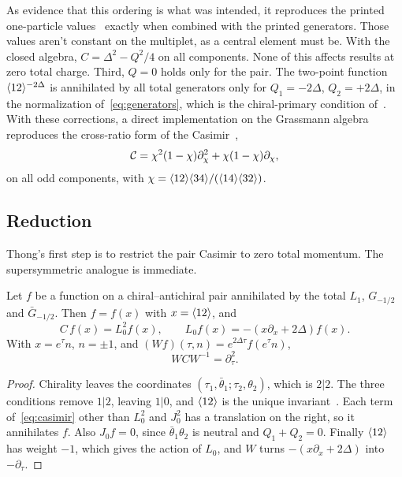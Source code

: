 As evidence that this ordering is what was intended, it reproduces the printed one-particle values~\cite[(A.10)--(A.12)]{Bulycheva:2018qcp} exactly when combined with the printed generators. Those values aren't constant on the multiplet, as a central element must be. With the closed algebra, $C=\Delta^2-Q^2/4$ on all components. None of this affects results at zero total charge. Third, $Q=0$ holds only for the pair. The two-point function $\langle 12\rangle^{-2\Delta}$ is annihilated by all total generators only for $Q_1=-2\Delta$, $Q_2=+2\Delta$, in the normalization of~\eqref{eq:generators}, which is the chiral-primary condition of~\cite{Fu:2016vas}. With these corrections, a direct implementation on the Grassmann algebra reproduces the cross-ratio form of the Casimir~\cite[(4.9), (A.16)]{Bulycheva:2018qcp},
\begin{equation}\label{eq:casimir-chi}
\mathcal{C}=\chi^2(1-\chi)\partial_\chi^2+\chi(1-\chi)\partial_\chi,
\end{equation}
on all odd components, with $\chi=\langle 12\rangle\langle 34\rangle/(\langle 14\rangle\langle 32\rangle)$.

\subsection{Reduction}

Thong's first step is to restrict the pair Casimir to zero total momentum. The supersymmetric analogue is immediate.

\begin{proposition}\label{prop:cylinder}
Let $f$ be a function on a chiral--antichiral pair annihilated by the total $L_1$, $G_{-1/2}$ and $\bar G_{-1/2}$. Then $f=f(x)$ with $x=\langle 12\rangle$, and
\begin{equation}\label{eq:reduced-casimir}
C\,f(x)=L_0^2f(x),\qquad L_0f(x)=-(x\partial_x+2\Delta)f(x).
\end{equation}
With $x=e^\tau n$, $n=\pm1$, and $(Wf)(\tau,n)=e^{2\Delta\tau}f(e^\tau n)$,
\begin{equation}\label{eq:WCW}
WCW^{-1}=\partial_\tau^2.
\end{equation}
\end{proposition}

\begin{proof}
Chirality leaves the coordinates $(\tau_1,\bar\theta_1;\tau_2,\theta_2)$, which is $2|2$. The three conditions remove $1|2$, leaving $1|0$, and $\langle 12\rangle$ is the unique invariant~\cite{Bulycheva:2018qcp}. Each term of~\eqref{eq:casimir} other than $L_0^2$ and $J_0^2$ has a translation on the right, so it annihilates $f$. Also $J_0f=0$, since $\bar\theta_1\theta_2$ is neutral and $Q_1+Q_2=0$. Finally $\langle 12\rangle$ has weight $-1$, which gives the action of $L_0$, and $W$ turns $-(x\partial_x+2\Delta)$ into $-\partial_\tau$.
\end{proof}

